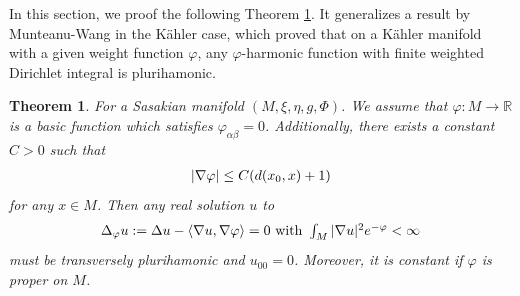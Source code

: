 \documentclass[12pt]{amsart}%
\newtheorem{theorem}{Theorem}
\numberwithin{equation}{section}
\begin{document}
In this section, we proof the following Theorem \ref{Thm2}. It generalizes a
result by Munteanu-Wang \cite{mw1} in the K\"{a}hler case, which proved that
on a K\"{a}hler manifold with a given weight function $\varphi$, any $\varphi
$-harmonic function with finite weighted Dirichlet integral is plurihamonic.

\begin{theorem}
\label{Thm2}For a Sasakian manifold $(M,\xi,\eta,g,\Phi)$. We assume that
$\varphi:M\rightarrow\mathbb{R}$ is a basic function which satisfies
$\varphi_{\alpha\beta}=0$. Additionally, there exists a constant $C>0$ such
that
\[%
\begin{array}
[c]{c}%
|\nabla\varphi|\leq C(d(x_{0},x)+1)
\end{array}
\]
for any $x\in M$. Then any real solution $u$ to
\[%
\begin{array}
[c]{c}%
\Delta_{\varphi}u:=\Delta u-\left\langle \nabla u,\nabla\varphi\right\rangle
=0\text{\ \textrm{with}\ }\int_{M}|\nabla u|^{2}e^{-\varphi}<\infty
\end{array}
\]
must be transversely plurihamonic and $u_{00}=0$. Moreover, it is constant if
$\varphi$ is proper on $M$.
\end{theorem}
\end{document}
